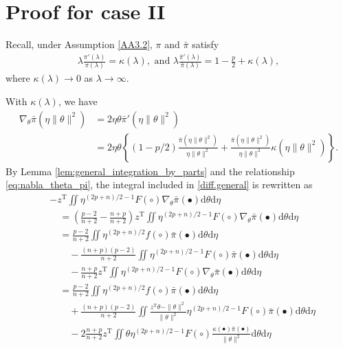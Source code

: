 \documentclass[preprint,11pt]{imsart}
\numberwithin{equation}{section}
\theoremstyle{plain}
\theoremstyle{definition}
\theoremstyle{remark}
\def\T{{ \mathrm{\scriptscriptstyle T} }}
\newcommand{\rd}{\mathrm{d}}
\begin{document}
\section{Proof for case II}
\label{sec:caseII}
Recall, under Assumption \ref{AA3.2}, $\pi$ and $\bar{\pi}$ satisfy
\begin{align*}
 \lambda\frac{\pi'(\lambda)}{\pi(\lambda)}=\kappa(\lambda), \text{ and }\lambda\frac{\bar{\pi}'(\lambda)}{\bar{\pi}(\lambda)}=1-\frac{p}{2}+\kappa(\lambda),
\end{align*}
where $\kappa(\lambda)\to 0$ as $\lambda\to\infty$.

With $\kappa(\lambda)$, we have
\begin{equation}\label{eq:nabla_theta_pi}
 \begin{split}
 \nabla_\theta\bar{\pi}(\eta\|\theta\|^2)&=
  2\eta\theta\bar{\pi}'(\eta\|\theta\|^2)\\
 &=2\eta\theta\left\{(1-p/2)\frac{\bar{\pi}(\eta\|\theta\|^2)}{\eta\|\theta\|^2}+
 \frac{\bar{\pi}(\eta\|\theta\|^2)}{\eta\|\theta\|^2}\kappa(\eta\|\theta\|^2)\right\}.
\end{split}
\end{equation}
By Lemma \ref{lem:general_integration_by_parts} and the relationship
\eqref{eq:nabla_theta_pi}, the integral included in \eqref{diff.general}
is rewritten as
\begin{align*}
 & -z^\T\iint   \eta^{(2p+n)/2-1} F(\circ)
 \nabla_\theta\bar{\pi}(\bullet) \rd \theta   \rd \eta \\
 &\quad = \left(\frac{p-2}{n+2}-\frac{n+p}{n+2}\right)
 z^\T\iint   \eta^{(2p+n)/2-1} F(\circ)
 \nabla_\theta\bar{\pi}(\bullet) \rd \theta   \rd \eta \\
 &\quad =\frac{p-2}{n+2}\iint   \eta^{(2p+n)/2} f(\circ)
 \bar{\pi}(\bullet) \rd \theta   \rd \eta \\
&\quad \quad -\frac{(n+p)(p-2)}{n+2}\iint   \eta^{(2p+n)/2-1} F(\circ)
 \bar{\pi}(\bullet) \rd \theta   \rd \eta \\
 &\quad \quad - \frac{n+p}{n+2}z^\T\iint   \eta^{(2p+n)/2-1} F(\circ)
 \nabla_\theta\bar{\pi}(\bullet) \rd \theta   \rd \eta \\
 &\quad =\frac{p-2}{n+2}\iint   \eta^{(2p+n)/2} f(\circ)
 \bar{\pi}(\bullet) \rd \theta   \rd \eta \\
&\quad \quad +\frac{(n+p)(p-2)}{n+2}\iint  \frac{z^\T\theta-\|\theta\|^2}{\|\theta\|^2} \eta^{(2p+n)/2-1} F(\circ)
 \bar{\pi}(\bullet) \rd \theta   \rd \eta \\
&\quad \quad -2\frac{n+p}{n+2}z^\T\iint  \theta\eta^{(2p+n)/2-1} F(\circ)
 \frac{\kappa(\bullet)\bar{\pi}(\bullet)}{\|\theta\|^2} \rd \theta   \rd \eta 
\end{align*}
\end{document}
